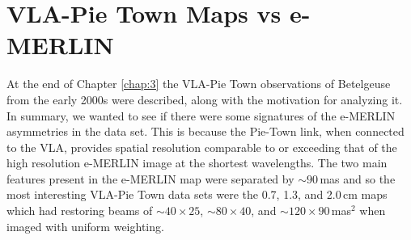 \section{VLA-Pie Town Maps vs e-MERLIN}\label{sec:5.13}
At the end of Chapter \ref{chap:3} the VLA-Pie Town observations of Betelgeuse from the early 2000s were described, along with the motivation for analyzing it. In summary, we wanted to see if there were some signatures of the e-MERLIN asymmetries in the data set. This is because the Pie-Town link, when connected to the VLA, provides spatial resolution comparable to or exceeding that of the high resolution e-MERLIN image at the shortest wavelengths. The two main features present in the e-MERLIN map were separated by $\sim 90$\,mas and so the most interesting VLA-Pie Town data sets were the 0.7, 1.3, and 2.0\,cm maps which had restoring beams of $\sim 40 \times 25$, $\sim 80 \times 40$, and $\sim 120 \times 90$\,mas$^{2}$ when imaged with uniform weighting. 


